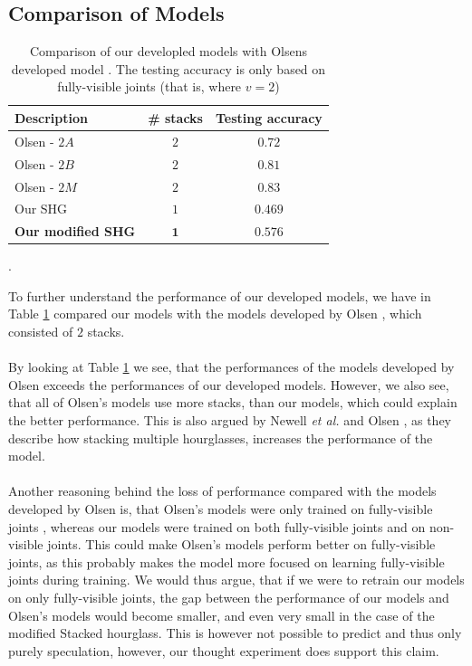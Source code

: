 \documentclass[./main.tex]{subfiles}
\begin{document}
\subsection{Comparison of Models}\label{subsec:comparisons}
\begin{table}[htbp]
    \begin{tabular}{l|c|c}
        Description & \# stacks & Testing accuracy \\
        \hline
        Olsen - $2A$ & $2$ & $0.72$ \\
        \hline
        Olsen - $2B$ & $2$ & $0.81$ \\
        \hline
        Olsen - $2M$ & $2$ & $0.83$ \\
        \hline
        \hline
        Our SHG & $1$ & $0.469$ \\
        \hline
        \textbf{Our modified SHG} & $\bm{1}$ & $\bm{0.576}$ \\
        \hline
    \end{tabular}
    \caption{Comparison of our developled models with Olsens developed model \cite{Camilla}. The testing accuracy is only based on fully-visible joints (that is, where $v = 2$)}.
    \label{fig:Olsen_comparison}
\end{table}
\noindent To further understand the performance of our developed models, we have in Table \ref{fig:Olsen_comparison} compared our models with the models developed by Olsen \cite{Camilla}, which consisted of $2$ stacks.
\\
\\
By looking at Table \ref{fig:Olsen_comparison} we see, that the performances of the models developed by Olsen \cite{Camilla} exceeds the performances of our developed models. However, we also see, that all of Olsen's \cite{Camilla} models use more stacks, than our models, which could explain the better performance. This is also argued by Newell \textit{et al.} \cite{Newell} and Olsen \cite{Camilla}, as they describe how stacking multiple hourglasses, increases the performance of the model.
\\
\\
Another reasoning behind the loss of performance compared with the models developed by Olsen \cite{Camilla} is, that Olsen's models were only trained on fully-visible joints \cite{Camilla}, whereas our models were trained on both fully-visible joints and on non-visible joints. This could make Olsen's models \cite{Camilla} perform better on fully-visible joints, as this probably makes the model more focused on learning fully-visible joints during training. We would thus argue, that if we were to retrain our models on only fully-visible joints, the gap between the performance of our models and Olsen's models \cite{Camilla} would become smaller, and even very small in the case of the modified Stacked hourglass. This is however not possible to predict and thus only purely speculation, however, our thought experiment does support this claim.
\end{document}

